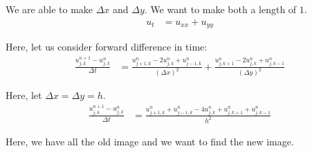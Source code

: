 \documentclass{article}
\begin{document}

We are able to make $\Delta x$ and $\Delta y$. We want to make both a length of $1$.
%
\begin{align}
  u_t & = u_{xx} + u_{yy}
\end{align}

Here, let us consider forward difference in time:
%
\begin{align}
  \frac
  {u^{n + 1}_{j, k} - u^n_{j, k}}
  {\Delta t}
  & =
  \frac
  {
  u^n_{j+1, k} - 2u^n_{j, k} + u^n_{j - 1, k}
  }
  {
  (\Delta x)^2
  }
  +
  \frac
  {
  u^n_{j, k+1} - 2u^n_{j, k} + u^n_{j, k - 1}
  }
  {
  (\Delta y)^2
  }
\end{align}

Here, let $\Delta x = \Delta y = h$.
%
\begin{align}
  \frac
  {u^{n + 1}_{j, k} - u^n_{j, k}}
  {\Delta t}
  & = \frac
  {
  u^n_{j+1, k} + u^n_{j-1, k} - 4u^n_{j, k} + u^n_{j, k+1} + u^n_{j, k-1}
  }
  {h^2}
\end{align}

Here, we have all the old image and we want to find the new image.
\end{document}
